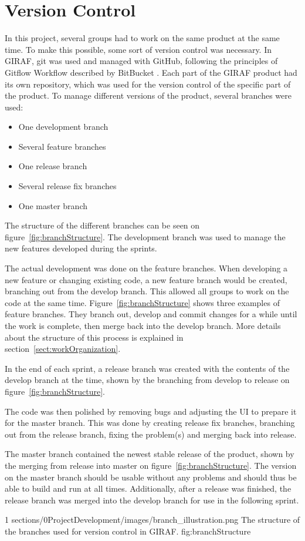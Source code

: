 \section{Version Control}
\label{sect:versionControl}

In this project, several groups had to work on the same product at the same time. To make this possible, some sort of version control was necessary. In GIRAF, git was used and managed with GitHub, following the principles of Gitflow Workflow described by BitBucket \citep{cite:gitFlow}. Each part of the GIRAF product had its own repository, which was used for the version control of the specific part of the product. To manage different versions of the product, several branches were used:
\begin{itemize}
    \item One development branch
    \item Several feature branches
    \item One release branch
    \item Several release fix branches
    \item One master branch
\end{itemize}

The structure of the different branches can be seen on figure~\ref{fig:branchStructure}.
The development branch was used to manage the new features developed during the sprints. 

The actual development was done on the feature branches. When developing a new feature or changing existing code, a new feature branch would be created, branching out from the develop branch. This allowed all groups to work on the code at the same time. Figure~\ref{fig:branchStructure} shows three examples of feature branches. They branch out, develop and commit changes for a while until the work is complete, then merge back into the develop branch. More details about the structure of this process is explained in section~\ref{sect:workOrganization}.

In the end of each sprint, a release branch was created with the contents of the develop branch at the time, shown by the branching from develop to release on figure~\ref{fig:branchStructure}.

The code was then polished by removing bugs and adjusting the UI to prepare it for the master branch. This was done by creating release fix branches, branching out from the release branch, fixing the problem(s) and merging back into release.

The master branch contained the newest stable release of the product, shown by the merging from release into master on figure~\ref{fig:branchStructure}. 
The version on the master branch should be usable without any problems and should thus be able to build and run at all times. 
Additionally, after a release was finished, the release branch was merged into the develop branch for use in the following sprint.

        {1} %
        {sections/0ProjectDevelopment/images/branch_illustration.png} %
        {The structure of the branches used for version control in GIRAF.} %
        {fig:branchStructure} %